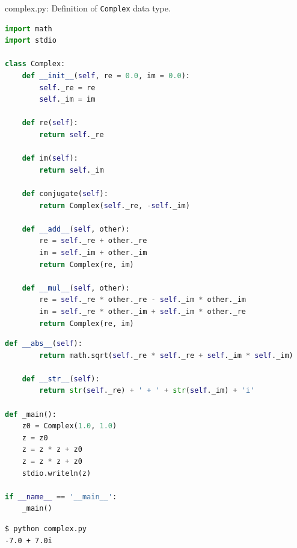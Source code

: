 \documentclass[8pt,a4paper,compress]{beamer}
\begin{document}
\begin{frame}[fragile]
\pause

\begin{framed}
\tiny complex.py: Definition of \lstinline{Complex} data type.
\end{framed}

\begin{lstlisting}[language=Python]
import math
import stdio

class Complex:
    def __init__(self, re = 0.0, im = 0.0):
        self._re = re
        self._im = im

    def re(self):
        return self._re

    def im(self):
        return self._im

    def conjugate(self):
        return Complex(self._re, -self._im)

    def __add__(self, other):
        re = self._re + other._re
        im = self._im + other._im
        return Complex(re, im)

    def __mul__(self, other):
        re = self._re * other._re - self._im * other._im
        im = self._re * other._im + self._im * other._re
        return Complex(re, im)
\end{lstlisting}
\end{frame}

\begin{frame}[fragile]
\pause

\begin{lstlisting}[language=Python]
    def __abs__(self):
        return math.sqrt(self._re * self._re + self._im * self._im)

    def __str__(self):
        return str(self._re) + ' + ' + str(self._im) + 'i'

def _main():
    z0 = Complex(1.0, 1.0)
    z = z0
    z = z * z + z0
    z = z * z + z0
    stdio.writeln(z)

if __name__ == '__main__':
    _main()
\end{lstlisting}

\pause

\begin{lstlisting}[language={}]
$ python complex.py 
-7.0 + 7.0i
\end{lstlisting}
\end{frame}
\end{document}
